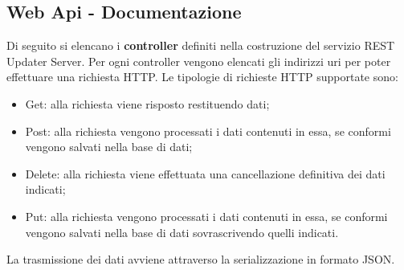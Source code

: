 \documentclass[../RelazioneFinale.tex]{subfiles}
\begin{document}
	
\newpage 
		
			\subsection{Web Api - Documentazione}
			\label{subsec:WebApi}
				Di seguito si elencano i \textbf{controller} definiti nella costruzione del servizio REST Updater Server. Per ogni controller vengono elencati gli indirizzi uri per poter effettuare una richiesta HTTP.
				Le tipologie di richieste HTTP supportate sono:
				\begin{itemize}
					\item Get: alla richiesta viene risposto restituendo dati;
					\item Post: alla richiesta vengono processati i dati contenuti in essa, se conformi vengono salvati nella base di dati;
					\item Delete: alla richiesta viene effettuata una cancellazione definitiva dei dati indicati;
					\item Put: alla richiesta vengono processati i dati contenuti in essa, se conformi vengono salvati nella base di dati sovrascrivendo quelli indicati.
				\end{itemize}
				
				La trasmissione dei dati avviene attraverso la serializzazione in formato JSON.
		
\end{document}
